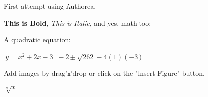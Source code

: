 First attempt using Authorea.

\textbf{This is Bold}, \textit{This is Italic}, and yes, math too:

A quadratic equation:

$\ y = x^{2} + 2x -3 $
$\ -2 \pm \sqrt{26{2}}-4(1)(-3)$




Add images by drag'n'drop or click on the "Insert Figure" button.

$\sqrt[n]{x}$